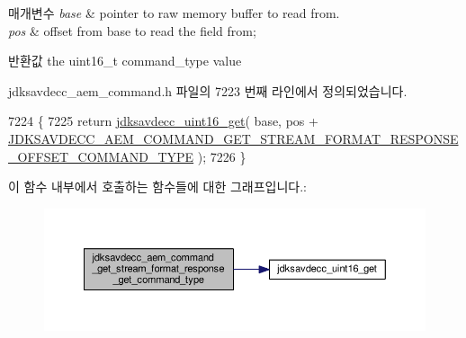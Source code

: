 \begin{DoxyParams}{매개변수}
{\em base} & pointer to raw memory buffer to read from. \\
\hline
{\em pos} & offset from base to read the field from; \\
\hline
\end{DoxyParams}
\begin{DoxyReturn}{반환값}
the uint16\+\_\+t command\+\_\+type value 
\end{DoxyReturn}


jdksavdecc\+\_\+aem\+\_\+command.\+h 파일의 7223 번째 라인에서 정의되었습니다.


\begin{DoxyCode}
7224 \{
7225     \textcolor{keywordflow}{return} \hyperlink{group__endian_ga3fbbbc20be954aa61e039872965b0dc9}{jdksavdecc\_uint16\_get}( base, pos + 
      \hyperlink{group__command__get__stream__format__response_ga7eb2723c2f20c97776bcbae92b669c20}{JDKSAVDECC\_AEM\_COMMAND\_GET\_STREAM\_FORMAT\_RESPONSE\_OFFSET\_COMMAND\_TYPE}
       );
7226 \}
\end{DoxyCode}


이 함수 내부에서 호출하는 함수들에 대한 그래프입니다.\+:
\nopagebreak
\begin{figure}[H]
\begin{center}
\leavevmode
\includegraphics[width=350pt]{group__command__get__stream__format__response_gae6ff35a2ef8bb5be6fd4f0e24c9356ce_cgraph}
\end{center}
\end{figure}


